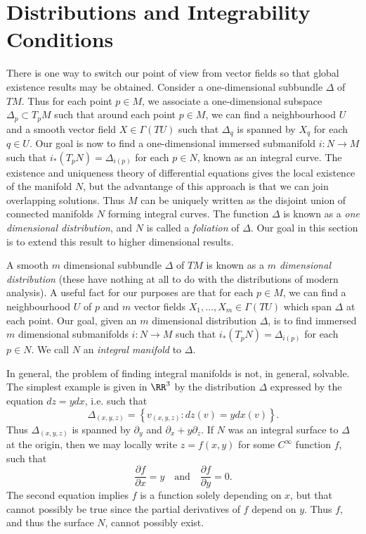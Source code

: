 \section{Distributions and Integrability Conditions}

There is one way to switch our point of view from vector fields so that global existence results may be obtained. Consider a one-dimensional subbundle $\Delta$ of $TM$. Thus for each point $p \in M$, we associate a one-dimensional subspace $\Delta_p \subset T_p M$ such that around each point $p \in M$, we can find a neighbourhood $U$ and a smooth vector field $X \in \Gamma(TU)$ such that $\Delta_q$ is spanned by $X_q$ for each $q \in U$. Our goal is now to find a one-dimensional immersed submanifold $i: N \to M$ such that $i_*(T_pN) = \Delta_{i(p)}$ for each $p \in N$, known as an integral curve. The existence and uniqueness theory of differential equations gives the local existence of the manifold $N$, but the advantange of this approach is that we can join overlapping solutions. Thus $M$ can be uniquely written as the disjoint union of connected manifolds $N$ forming integral curves. The function $\Delta$ is known as a \emph{one dimensional distribution}, and $N$ is called a \emph{foliation} of $\Delta$. Our goal in this section is to extend this result to higher dimensional results.

A smooth $m$ dimensional subbundle $\Delta$ of $TM$ is known as a \emph{$m$ dimensional distribution} (these have nothing at all to do with the distributions of modern analysis). A useful fact for our purposes are that for each $p \in M$, we can find a neighbourhood $U$ of $p$ and $m$ vector fields $X_1, \dots, X_m \in \Gamma(TU)$ which span $\Delta$ at each point. Our goal, given an $m$ dimensional distribution $\Delta$, is to find immersed $m$ dimensional submanifolds $i: N \to M$ such that $i_*(T_p N) = \Delta_{i(p)}$ for each $p \in N$. We call $N$ an \emph{integral manifold} to $\Delta$.

In general, the problem of finding integral manifolds is not, in general, solvable. The simplest example is given in $\RR^3$ by the distribution $\Delta$ expressed by the equation $dz = y dx$, i.e. such that
%
\[ \Delta_{(x,y,z)} = \left\{ v_{(x,y,z)}: dz(v) = y dx(v) \right\}. \]
%
Thus $\Delta_{(x,y,z)}$ is spanned by $\partial_y$ and $\partial_x + y \partial_z$. If $N$ was an integral surface to $\Delta$ at the origin, then we may locally write $z = f(x,y)$ for some $C^\infty$ function $f$, such that
%
\[ \frac{\partial f}{\partial x} = y \quad\text{and}\quad \frac{\partial f}{\partial y} = 0. \]
%
The second equation implies $f$ is a function solely depending on $x$, but that cannot possibly be true since the partial derivatives of $f$ depend on $y$. Thus $f$, and thus the surface $N$, cannot possibly exist.

